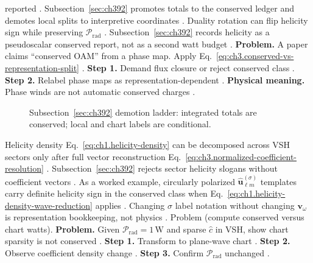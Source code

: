 reported \cite{belinfante1940}. Subsection~\ref{sec:ch392} promotes totals to the conserved ledger and demotes local splits to
interpretive coordinates \cite{stratton1941}.
Duality rotation can flip helicity sign while preserving \(\mathcal{P}_{\mathrm{rad}}\) \cite{belinfante1940}.
Subsection~\ref{sec:ch392} records helicity as a pseudoscalar conserved report, not as a second watt budget \cite{stratton1941}.
\textbf{Problem.} A paper claims ``conserved OAM'' from a phase map. Apply Eq.~\eqref{eq:ch3.conserved-vs-representation-split}
\cite{belinfante1940}.
\textbf{Step 1.} Demand flux closure or reject conserved class \cite{poynting1884}.
\textbf{Step 2.} Relabel phase maps as representation-dependent \cite{allen1992}.
\textbf{Physical meaning.} Phase winds are not automatic conserved charges \cite{belinfante1940}.
\begin{figure}[t]
\centering
{}
\caption{Subsection~\ref{sec:ch392} demotion ladder: integrated totals are conserved; local and chart labels are conditional.}
\label{fig:ch3.392-demotion-ladder}
\end{figure}
Helicity density Eq.~\eqref{eq:ch1.helicity-density} can be decomposed across VSH sectors only after full vector reconstruction
Eq.~\eqref{eq:ch3.normalized-coefficient-resolution} \cite{hansen1988}. Subsection~\ref{sec:ch392} rejects
sector helicity slogans without coefficient vectors \cite{stratton1941}.
As a worked example, circularly polarized \(\widehat{\mathbf{u}}_{\ell m}^{(\sigma)}\) templates carry definite helicity sign in the conserved class when
Eq.~\eqref{eq:ch1.helicity-density-wave-reduction} applies \cite{belinfante1940}. Changing \(\sigma\) label
notation without changing \(\mathbf{v}_\omega\) is representation bookkeeping, not physics \cite{harrington2001}.
Problem (compute conserved versus chart watts). \textbf{Problem.} Given \(\mathcal{P}_{\mathrm{rad}}=1\,\mathrm{W}\) and sparse \(\widehat{c}\) in VSH, show chart sparsity is not conserved
\cite{poynting1884}.
\textbf{Step 1.} Transform to plane-wave chart \cite{hansen1988}.
\textbf{Step 2.} Observe coefficient density change \cite{harrington2001}.
\textbf{Step 3.} Confirm \(\mathcal{P}_{\mathrm{rad}}\) unchanged \cite{poynting1884}.
